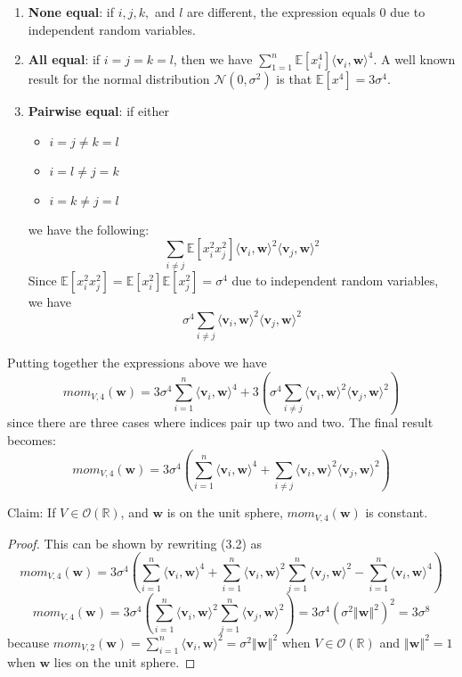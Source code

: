 \documentclass[12 pt]{article}        	%
\newcommand{\mat}[1]{\mathit{#1}}
\renewcommand{\vec}[1]{\mathbf{#1}}
\newcommand{\normdist}[2]{\mathcal{N}(#1, #2^2)}
\newcommand{\bb}[1]{\mathbb{#1}}
\begin{document}
\begin{enumerate}
    \item \textbf{None equal}: if $i, j, k,$ and $l$ are different, the expression equals 0 due to independent random variables.
    \item \textbf{All equal}: if $i = j = k = l$, then we have $\sum_{1=1}^{n} \bb{E}[x_i ^4] \langle \vec{v}_i, \vec{w} \rangle^4$. 
        A well known result for the normal distribution $\normdist{0}{\sigma}$ is that $\bb{E}[x^4] = 3 \sigma^4$.
    \item \textbf{Pairwise equal}: if either 
        \begin{itemize}
            \item $i=j \neq k=l$
            \item $i=l \neq j=k$
            \item $i=k \neq j=l$
        \end{itemize}
        we have the following:
        \[
            \sum_{i\neq j} \bb{E}[x_i^2x_j^2] \langle \vec{v}_i, \vec{w} \rangle ^2 \langle \vec{v}_j, \vec{w} \rangle^2
        \]
        Since $\bb{E}[x_i^2x_j^2] = \bb{E}[x_i^2]\bb{E}[x_j^2] = \sigma^4$ due to independent random variables, we have
        \[
            \sigma^4 \sum_{i\neq j} \langle \vec{v}_i, \vec{w} \rangle ^2 \langle \vec{v}_j, \vec{w} \rangle^2
        \]
\end{enumerate}
Putting together the expressions above we have
\[mom_{\mat{V}, 4}(\vec{w}) = 3 \sigma^4 \sum_{i=1}^{n} \langle \vec{v}_i, \vec{w}\rangle^4 + 3(\sigma^4 \sum_{i \neq j} \langle \vec{v}_i, \vec{w}\rangle^2 \langle \vec{v}_j, \vec{w}\rangle^2)\] 
since there are three cases where indices pair up two and two. The final result becomes:
\begin{equation}
    mom_{\mat{V}, 4}(\vec{w}) = 3 \sigma^4 (\sum_{i=1}^{n} \langle \vec{v}_i, \vec{w}\rangle^4 + \sum_{i \neq j} \langle \vec{v}_i, \vec{w}\rangle^2 \langle \vec{v}_j, \vec{w}\rangle^2)
\end{equation}

Claim: If $\mat{V} \in \mathcal{O}(\bb{R})$, and $\vec{w}$ is on the unit sphere, $mom_{\mat{V}, 4}(\vec{w})$ is constant. 

\begin{proof}
This can be shown by rewriting (3.2) as  
\[ mom_{\mat{V}, 4}(\vec{w}) = 3\sigma^4(\sum_{i=1}^n \langle \vec{v}_i, \vec{w}\rangle^4 + \sum_{i=1}^n \langle \vec{v}_i, \vec{w} \rangle^2 \sum_{j=1}^n \langle \vec{v}_j, \vec{w}\rangle^2 - \sum_{i=1}^n\langle \vec{v}_i, \vec{w}\rangle^4 )\]
\[ mom_{\mat{V}, 4}(\vec{w}) = 3\sigma^4(\sum_{i=1}^n \langle \vec{v}_i, \vec{w}\rangle^2 \sum_{j=1}^n \langle \vec{v}_j, \vec{w}\rangle^2) = 3\sigma^4(\sigma^2\left \Vert \vec{w} \right \Vert^2)^2 = 3\sigma^8\]
because $mom_{\mat{V}, 2}(\vec{w}) = \sum_{i=1}^n \langle \vec{v}_i, \vec{w}\rangle^2 = \sigma^2 \left \Vert \vec{w} \right \Vert^2$ when $\mat{V} \in \mathcal{O}(\bb{R})$ and $\left \Vert \vec{w} \right \Vert^2 = 1$ when $\vec{w}$ lies on the unit sphere.
\end{proof}
\end{document}
